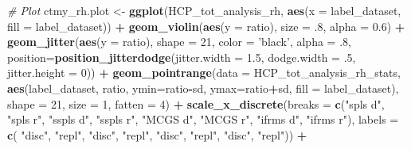 \documentclass[
]{article}
\newenvironment{Shaded}{\begin{snugshade}}{\end{snugshade}}
\newcommand{\CommentTok}[1]{\textcolor[rgb]{0.56,0.35,0.01}{\textit{#1}}}
\newcommand{\DataTypeTok}[1]{\textcolor[rgb]{0.13,0.29,0.53}{#1}}
\newcommand{\DecValTok}[1]{\textcolor[rgb]{0.00,0.00,0.81}{#1}}
\newcommand{\FloatTok}[1]{\textcolor[rgb]{0.00,0.00,0.81}{#1}}
\newcommand{\KeywordTok}[1]{\textcolor[rgb]{0.13,0.29,0.53}{\textbf{#1}}}
\newcommand{\NormalTok}[1]{#1}
\newcommand{\OperatorTok}[1]{\textcolor[rgb]{0.81,0.36,0.00}{\textbf{#1}}}
\newcommand{\StringTok}[1]{\textcolor[rgb]{0.31,0.60,0.02}{#1}}
\begin{document}
\begin{Shaded}
\begin{Highlighting}[]
\CommentTok{# Plot}
\NormalTok{ctmy_rh.plot <-}\StringTok{ }\KeywordTok{ggplot}\NormalTok{(HCP_tot_analysis_rh, }\KeywordTok{aes}\NormalTok{(}\DataTypeTok{x =}\NormalTok{ label_dataset, }\DataTypeTok{fill =}\NormalTok{ label_dataset)) }\OperatorTok{+}\StringTok{ }
\StringTok{  }\KeywordTok{geom_violin}\NormalTok{(}\KeywordTok{aes}\NormalTok{(}\DataTypeTok{y =}\NormalTok{ ratio), }\DataTypeTok{size =} \FloatTok{.8}\NormalTok{, }\DataTypeTok{alpha =} \FloatTok{0.6}\NormalTok{) }\OperatorTok{+}\StringTok{ }
\StringTok{  }\KeywordTok{geom_jitter}\NormalTok{(}\KeywordTok{aes}\NormalTok{(}\DataTypeTok{y =}\NormalTok{ ratio), }
              \DataTypeTok{shape =} \DecValTok{21}\NormalTok{, }\DataTypeTok{color =} \StringTok{'black'}\NormalTok{, }\DataTypeTok{alpha =} \FloatTok{.8}\NormalTok{,}
              \DataTypeTok{position=}\KeywordTok{position_jitterdodge}\NormalTok{(}\DataTypeTok{jitter.width =} \FloatTok{1.5}\NormalTok{, }
                                            \DataTypeTok{dodge.width =} \FloatTok{.5}\NormalTok{, }\DataTypeTok{jitter.height =} \DecValTok{0}\NormalTok{)) }\OperatorTok{+}\StringTok{ }
\StringTok{  }\KeywordTok{geom_pointrange}\NormalTok{(}\DataTypeTok{data =}\NormalTok{ HCP_tot_analysis_rh_stats, }
                  \KeywordTok{aes}\NormalTok{(label_dataset, ratio, }\DataTypeTok{ymin=}\NormalTok{ratio}\OperatorTok{-}\NormalTok{sd, }\DataTypeTok{ymax=}\NormalTok{ratio}\OperatorTok{+}\NormalTok{sd, }
                      \DataTypeTok{fill =}\NormalTok{ label_dataset), }
                  \DataTypeTok{shape =} \DecValTok{21}\NormalTok{, }\DataTypeTok{size =} \DecValTok{1}\NormalTok{, }\DataTypeTok{fatten =} \DecValTok{4}\NormalTok{) }\OperatorTok{+}
\StringTok{  }\KeywordTok{scale_x_discrete}\NormalTok{(}\DataTypeTok{breaks =} \KeywordTok{c}\NormalTok{(}\StringTok{"spls d"}\NormalTok{, }\StringTok{"spls r"}\NormalTok{, }
                              \StringTok{"sspls d"}\NormalTok{, }\StringTok{"sspls r"}\NormalTok{, }
                              \StringTok{"MCGS d"}\NormalTok{, }\StringTok{"MCGS r"}\NormalTok{, }
                              \StringTok{"ifrms d"}\NormalTok{, }\StringTok{"ifrms r"}\NormalTok{), }
                   \DataTypeTok{labels =} \KeywordTok{c}\NormalTok{(}
                              \StringTok{"disc"}\NormalTok{, }\StringTok{"repl"}\NormalTok{,}
                              \StringTok{"disc"}\NormalTok{, }\StringTok{"repl"}\NormalTok{, }
                              \StringTok{"disc"}\NormalTok{, }\StringTok{"repl"}\NormalTok{,}
                              \StringTok{"disc"}\NormalTok{, }\StringTok{"repl"}\NormalTok{)) }\OperatorTok{+}

\end{Highlighting}
\end{Shaded}
\end{document}
